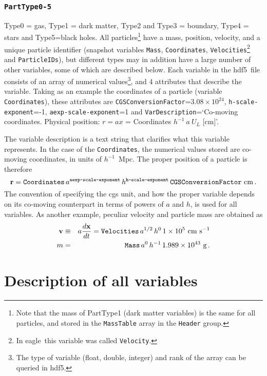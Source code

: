 \documentclass[10pt, a4paper]{article}
\newcommand{\eagle}{{\sc eagle}}
\newcommand{\hdf}{{\sc hdf5}}
\begin{document}
\subsubsection{\texttt{PartType0-5}}
\label{SecParticles}
Type0 = gas, Type1 = dark matter, Type2 and Type3 = boundary, Type4 = stars and Type5=black holes. All particles\footnote{Note that the mass of PartType1 (dark matter variables) is the same for all particles, and stored in the \texttt{MassTable} array in the \texttt{Header} group.} have a mass, position, velocity, and a unique particle identifier (snapshot variables \texttt{Mass}, \texttt{Coordinates}, \texttt{Velocities}\footnote{In \eagle\ this variable was called \texttt{Velocity}.} and \texttt{ParticleIDs}), but different types may in addition have a large number of other variables, some of which are described below. Each variable in the \hdf\ file consists of an array of numerical values\footnote{The type of variable (float, double, integer) and rank of the array can be queried in \hdf.}, and 4 attributes that describe the variable.  Taking as an example the coordinates of a particle (variable \texttt{Coordinates}), these attributes are \texttt{CGSConversionFactor}=$3.08\times 10^{24}$, \texttt{h-scale-exponent}=-1, \texttt{aexp-scale-exponent}=1 and \texttt{VarDescription}=`Co-moving coordinates. Physical position: $r = ax$ = Coordinates $h^{-1}~a~U_L$ [cm]'.

The variable description is a text string that clarifies what this variable represents. In the case of the \texttt{Coordinates}, the numerical values stored are co-moving coordinates, in units of $h^{-1}$~Mpc. The proper position of a particle is therefore \begin{equation} {\bf r} = \texttt{Coordinates}\,a^\texttt{aexp-scale-exponent}\,h^\texttt{h-scale-exponent}\,\texttt{CGSConversionFactor}~{\rm cm}\,.  \label{EqCoords} \end{equation} The convention of specifying the cgs unit, and how the proper variable depends on its co-moving counterpart in terms of powers of $a$ and $h$, is used for all variables. As another example, peculiar velocity and particle mass are obtained as
\begin{eqnarray}
{\bf v}&\equiv& a{d{\bf x}\over dt} = \texttt{Velocities}\,a^{1/2}\,h^0\,1\times 10^5~{\rm cm~s}^{-1}\nonumber\\
m &=& \texttt{Mass}\,a^0\,h^{-1}\,1.989\times 10^{43}~{\rm g}\,.	
\end{eqnarray}

\section{Description of all variables}
\end{document}
